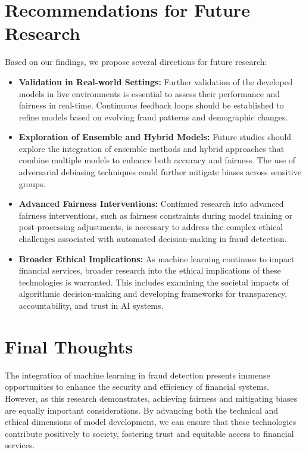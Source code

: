 \documentclass[12pt,a4paper]{report}
\begin{document}
\section{Recommendations for Future Research}

Based on our findings, we propose several directions for future research:

\begin{itemize}
    \item \textbf{Validation in Real-world Settings:} Further validation of the developed models in live environments is essential to assess their performance and fairness in real-time. Continuous feedback loops should be established to refine models based on evolving fraud patterns and demographic changes.
    
    \item \textbf{Exploration of Ensemble and Hybrid Models:} Future studies should explore the integration of ensemble methods and hybrid approaches that combine multiple models to enhance both accuracy and fairness. The use of adversarial debiasing techniques could further mitigate biases across sensitive groups.
    
    \item \textbf{Advanced Fairness Interventions:} Continued research into advanced fairness interventions, such as fairness constraints during model training or post-processing adjustments, is necessary to address the complex ethical challenges associated with automated decision-making in fraud detection.
    
    \item \textbf{Broader Ethical Implications:} As machine learning continues to impact financial services, broader research into the ethical implications of these technologies is warranted. This includes examining the societal impacts of algorithmic decision-making and developing frameworks for transparency, accountability, and trust in AI systems.
\end{itemize}

\section{Final Thoughts}

The integration of machine learning in fraud detection presents immense opportunities to enhance the security and efficiency of financial systems. However, as this research demonstrates, achieving fairness and mitigating biases are equally important considerations. By advancing both the technical and ethical dimensions of model development, we can ensure that these technologies contribute positively to society, fostering trust and equitable access to financial services.

\clearpage






\end{document}

